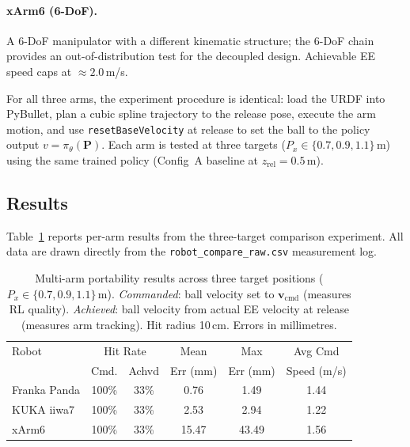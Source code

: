 \paragraph{xArm6 (6-DoF).}
A 6-DoF manipulator with a different kinematic structure; the 6-DoF chain provides
an out-of-distribution test for the decoupled design.
Achievable EE speed caps at $\approx 2.0$\,m/s.

For all three arms, the experiment procedure is identical: load the URDF into PyBullet,
plan a cubic spline trajectory to the release pose, execute the arm motion, and use
\texttt{resetBaseVelocity} at release to set the ball to the policy output
$v = \pi_\theta(\mathbf{P})$.
Each arm is tested at three targets ($P_x \in \{0.7, 0.9, 1.1\}$\,m) using the same
trained policy (Config~A baseline at $z_{\mathrm{rel}} = 0.5$\,m).

\subsection{Results}
\label{sec:study2:results}

Table~\ref{tab:multiarm} reports per-arm results from the three-target comparison
experiment.
All data are drawn directly from the \texttt{robot\_compare\_raw.csv} measurement log.

\begin{table}[t]
  \centering
  \caption{Multi-arm portability results across three target positions
           ($P_x \in \{0.7, 0.9, 1.1\}$\,m).
           \emph{Commanded}: ball velocity set to $\mathbf{v}_{\mathrm{cmd}}$
           (measures RL quality).
           \emph{Achieved}: ball velocity from actual EE velocity at release
           (measures arm tracking).
           Hit radius 10\,cm. Errors in millimetres.}
  \label{tab:multiarm}
  \small
  \begin{tabular}{lccccc}
    \toprule
    Robot & \multicolumn{2}{c}{Hit Rate} & Mean & Max & Avg Cmd \\
          & Cmd. & Achvd & Err (mm) & Err (mm) & Speed (m/s) \\
    \midrule
    Franka Panda & 100\% & 33\% & 0.76 & 1.49  & 1.44 \\
    KUKA iiwa7   & 100\% & 33\% & 2.53 & 2.94  & 1.22 \\
    xArm6        & 100\% & 33\% & 15.47& 43.49 & 1.56 \\
    \bottomrule
  \end{tabular}
\end{table}

